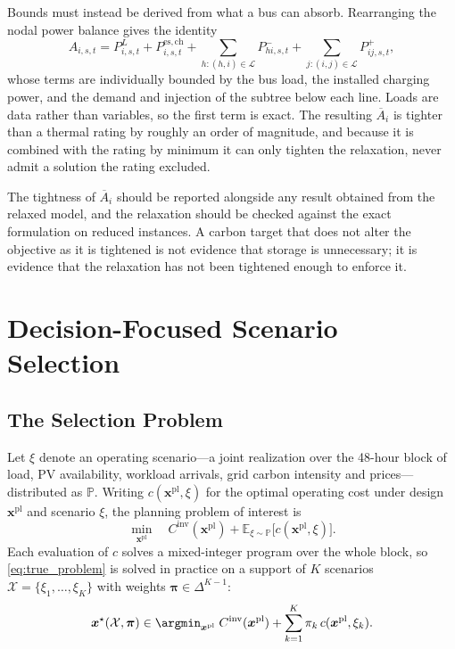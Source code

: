 Bounds must instead be derived from what a bus can absorb. Rearranging
the nodal power balance gives the identity
\begin{equation}
A_{i,s,t}
=
P_{i,s,t}^{L}
+P_{i,s,t}^{\mathrm{es,ch}}
+\!\!\sum_{h:(h,i)\in\mathcal{L}}\!\!P_{hi,s,t}^{-}
+\!\!\sum_{j:(i,j)\in\mathcal{L}}\!\!P_{ij,s,t}^{+},
\label{eq:incoming_identity}
\end{equation}
whose terms are individually bounded by the bus load, the installed
charging power, and the demand and injection of the subtree below each
line. Loads are data rather than variables, so the first term is exact.
The resulting $\overline{A}_i$ is tighter than a thermal rating by roughly
an order of magnitude, and because it is combined with the rating by
minimum it can only tighten the relaxation, never admit a solution the
rating excluded.

The tightness of $\overline{A}_i$ should be reported alongside any result
obtained from the relaxed model, and the relaxation should be checked
against the exact formulation on reduced instances. A carbon target that
does not alter the objective as it is tightened is not evidence that
storage is unnecessary; it is evidence that the relaxation has not been
tightened enough to enforce it.

\section{Decision-Focused Scenario Selection}
\label{sec:dfl}

\subsection{The Selection Problem}
\label{sec:selection_problem}

Let $\xi$ denote an operating scenario---a joint realization over the
48-hour block of load, PV availability, workload arrivals, grid carbon
intensity and prices---distributed as $\mathbb{P}$. Writing
$c(\boldsymbol{x}^{\mathrm{pl}},\xi)$ for the optimal operating cost
under design $\boldsymbol{x}^{\mathrm{pl}}$ and scenario $\xi$, the
planning problem of interest is
\begin{equation}
\min_{\boldsymbol{x}^{\mathrm{pl}}}
\quad
C^{\mathrm{inv}}(\boldsymbol{x}^{\mathrm{pl}})
+
\mathbb{E}_{\xi\sim\mathbb{P}}
\bigl[c(\boldsymbol{x}^{\mathrm{pl}},\xi)\bigr].
\label{eq:true_problem}
\end{equation}
Each evaluation of $c$ solves a mixed-integer program over the whole
block, so \eqref{eq:true_problem} is solved in practice on a support of
$K$ scenarios $\mathcal{X}=\{\xi_1,\dots,\xi_K\}$ with weights
$\boldsymbol{\pi}\in\Delta^{K-1}$:
\begin{equation}
\boldsymbol{x}^{\star}(\mathcal{X},\boldsymbol{\pi})
\in
\argmin_{\boldsymbol{x}^{\mathrm{pl}}}
\;
C^{\mathrm{inv}}(\boldsymbol{x}^{\mathrm{pl}})
+
\sum_{k=1}^{K}\pi_k\,c(\boldsymbol{x}^{\mathrm{pl}},\xi_k).
\label{eq:support_problem}
\end{equation}

